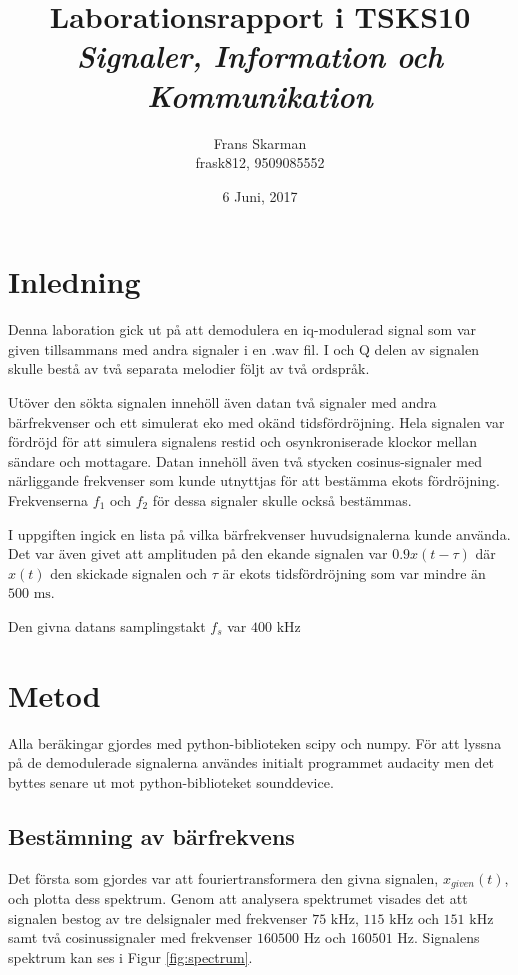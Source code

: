 \documentclass[10pt,twocolumn]{article}
\title{Laborationsrapport i TSKS10 \emph{Signaler, Information och Kommunikation}}
\author{Frans Skarman \\ frask812, 9509085552 }
\date{6 Juni, 2017}
\newcommand{\echodelay}{\tau}
\begin{document}
\maketitle

\section{Inledning}

Denna laboration gick ut på att demodulera en iq-modulerad signal som var given
tillsammans med andra signaler i en .wav fil. I och Q delen av signalen skulle
bestå av två separata melodier följt av två ordspråk.

Utöver den sökta signalen innehöll även datan två signaler med andra bärfrekvenser
och ett simulerat eko med okänd tidsfördröjning. Hela signalen var fördröjd
för att simulera signalens restid och osynkroniserade klockor mellan sändare och mottagare.
Datan innehöll
även två stycken cosinus-signaler med närliggande frekvenser som kunde utnyttjas för
att bestämma ekots fördröjning. Frekvenserna $f_1$ och $f_2$ för dessa signaler 
skulle också bestämmas.

I uppgiften ingick en lista på vilka bärfrekvenser huvudsignalerna kunde använda.
Det var även givet att amplituden på den ekande signalen var $0.9 x(t-\echodelay)$
där $x(t)$ den skickade signalen och $\echodelay$ är ekots tidsfördröjning som var
mindre än $500 \text{ ms}$.

Den givna datans samplingstakt $f_s$ var $400 \text{ kHz}$



\section{Metod}


Alla beräkingar gjordes med python-biblioteken scipy och numpy. För att lyssna på de demodulerade
signalerna användes initialt programmet audacity men det byttes senare ut mot python-biblioteket
sounddevice.

\subsection{Bestämning av bärfrekvens}

Det första som gjordes var att fouriertransformera den givna signalen, $x_{given}(t)$, och plotta
dess spektrum. Genom att analysera spektrumet visades det att signalen bestog av tre
delsignaler med frekvenser $75 \text{ kHz}$, $115 \text{ kHz}$ och $151 \text{ kHz}$ samt två cosinussignaler med 
frekvenser $160500 \text{ Hz}$ och $160501 \text{ Hz}$. Signalens spektrum kan ses i Figur \ref{fig:spectrum}.
\end{document}
